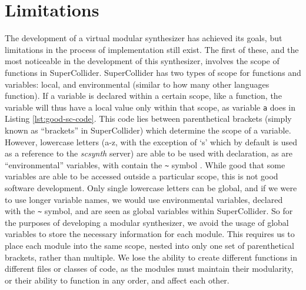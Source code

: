\section{Limitations}\label{section:limitations}

The development of a virtual modular synthesizer has achieved its goals, but limitations in the process of implementation still exist. The first of these, and the most noticeable in the development of this synthesizer, involves the scope of functions in SuperCollider. SuperCollider has two types of scope for functions and variables: local, and environmental (similar to how many other languages function). If a variable is declared within a certain scope, like a function, the variable will thus have a local value only within that scope, as variable \texttt{a} does in Listing \ref{lst:good-sc-code}. This code lies between parenthetical brackets (simply known as ``brackets'' in SuperCollider) which determine the scope of a variable. However, lowercase letters (a-z, with the exception of `s' which by default is used as a reference to the \textit{scsynth} server) are able to be used with declaration, as are ``environmental'' variables, with contain the \texttt{\~} symbol \cite{McCartney_2016}. While good that some variables are able to be accessed outside a particular scope, this is not good software development. Only single lowercase letters can be global, and if we were to use longer variable names, we would use environmental variables, declared with the \texttt{\~} symbol, and are seen as global variables within SuperCollider. So for the purposes of developing a modular synthesizer, we avoid the usage of global variables to store the necessary information for each module. This requires us to place each module into the same scope, nested into only one set of parenthetical brackets, rather than multiple. We lose the ability to create different functions in different files or classes of code, as the modules must maintain their modularity, or their ability to function in any order, and affect each other.